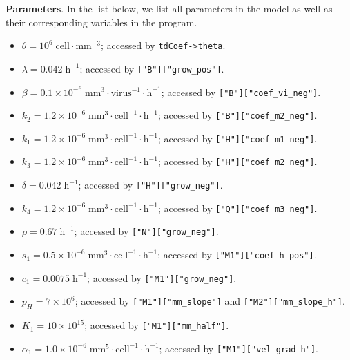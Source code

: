 \documentclass[reqno]{amsart}
\theoremstyle{definition}
\theoremstyle{remark}
\numberwithin{equation}{section}
\numberwithin{figure}{section}
\begin{document}
{\bf Parameters}. 
In the list below, we list all parameters in the model as well as their corresponding variables in the program.
\begin{itemize}
  \item {\color{cyan}$\theta=10^6\;\textrm{cell}\cdot\textrm{mm}^{-3}$}; accessed by {\color{green}\texttt{tdCoef->theta}}.
  \item {\color{cyan}$\lambda=0.042\;\textrm{h}^{-1}$}; accessed by {\color{green}\texttt{["B"]["grow\_pos"]}}.
  \item {\color{cyan}$\beta=0.1\times10^{-6}\;\textrm{mm}^3\cdot\textrm{virus}^{-1}\cdot\textrm{h}^{-1}$}; accessed by {\color{green}\texttt{["B"]["coef\_vi\_neg"]}}.
  \item {\color{cyan}$k_2=1.2\times10^{-6}\;\textrm{mm}^3\cdot\textrm{cell}^{-1}\cdot\textrm{h}^{-1}$}; accessed by {\color{green}\texttt{["B"]["coef\_m2\_neg"]}}.
  \item {\color{cyan}$k_1=1.2\times10^{-6}\;\textrm{mm}^3\cdot\textrm{cell}^{-1}\cdot\textrm{h}^{-1}$}; accessed by {\color{green}\texttt{["H"]["coef\_m1\_neg"]}}.
  \item {\color{cyan}$k_3=1.2\times10^{-6}\;\textrm{mm}^3\cdot\textrm{cell}^{-1}\cdot\textrm{h}^{-1}$}; accessed by {\color{green}\texttt{["H"]["coef\_m2\_neg"]}}.
  \item {\color{cyan}$\delta=0.042\;\textrm{h}^{-1}$}; accessed by {\color{green}\texttt{["H"]["grow\_neg"]}}.
  \item {\color{cyan}$k_4=1.2\times10^{-6}\;\textrm{mm}^3\cdot\textrm{cell}^{-1}\cdot\textrm{h}^{-1}$}; accessed by {\color{green}\texttt{["Q"]["coef\_m3\_neg"]}}.
  \item {\color{cyan}$\rho=0.67\;\textrm{h}^{-1}$}; accessed by {\color{green}\texttt{["N"]["grow\_neg"]}}.
  \item {\color{cyan}$s_1=0.5\times10^{-6}\;\textrm{mm}^3\cdot\textrm{cell}^{-1}\cdot\textrm{h}^{-1}$}; accessed by {\color{green}\texttt{["M1"]["coef\_h\_pos"]}}.
  \item {\color{cyan}$c_1=0.0075\;\textrm{h}^{-1}$}; accessed by {\color{green}\texttt{["M1"]["grow\_neg"]}}.
  \item {\color{cyan}$p_H=7\times10^6$}; accessed by {\color{green}\texttt{["M1"]["mm\_slope"]}} and {\color{green}\texttt{["M2"]["mm\_slope\_h"]}}.
  \item {\color{cyan}$K_1=10\times10^{15}$}; accessed by {\color{green}\texttt{["M1"]["mm\_half"]}}.
  \item {\color{cyan}$\alpha_1=1.0\times10^{-6}\;\textrm{mm}^5\cdot\textrm{cell}^{-1}\cdot\textrm{h}^{-1}$}; accessed by {\color{green}\texttt{["M1"]["vel\_grad\_h"]}}.

\end{itemize}
\end{document}
